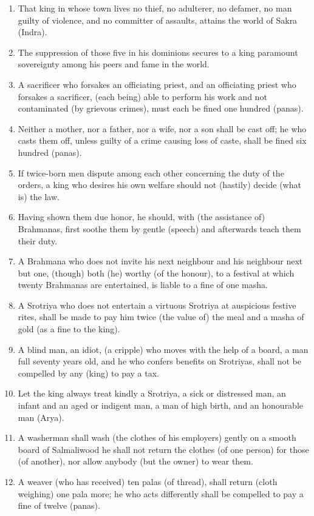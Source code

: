 \begin{enumerate}
\item That king in whose town lives no thief, no adulterer, no defamer, no man guilty of violence, and no committer of assaults, attains the world of Sakra (Indra).
\item The suppression of those five in his dominions secures to a king paramount sovereignty among his peers and fame in the world.
\item A sacrificer who forsakes an officiating priest, and an officiating priest who forsakes a sacrificer, (each being) able to perform his work and not contaminated (by grievous crimes), must each be fined one hundred (panas).
\item Neither a mother, nor a father, nor a wife, nor a son shall be cast off; he who casts them off, unless guilty of a crime causing loss of caste, shall be fined six hundred (panas).
\item If twice-born men dispute among each other concerning the duty of the orders, a king who desires his own welfare should not (hastily) decide (what is) the law.
\item Having shown them due honor, he should, with (the assistance of) Brahmanas, first soothe them by gentle (speech) and afterwards teach them their duty.
\item A Brahmana who does not invite his next neighbour and his neighbour next but one, (though) both (he) worthy (of the honour), to a festival at which twenty Brahmanas are entertained, is liable to a fine of one masha.
\item A Srotriya who does not entertain a virtuous Srotriya at auspicious festive rites, shall be made to pay him twice (the value of) the meal and a masha of gold (as a fine to the king).
\item A blind man, an idiot, (a cripple) who moves with the help of a board, a man full seventy years old, and he who confers benefits on Srotriyas, shall not be compelled by any (king) to pay a tax.
\item Let the king always treat kindly a Srotriya, a sick or distressed man, an infant and an aged or indigent man, a man of high birth, and an honourable man (Arya).
\item A washerman shall wash (the clothes of his employers) gently on a smooth board of Salmaliwood he shall not return the clothes (of one person) for those (of another), nor allow anybody (but the owner) to wear them.
\item A weaver (who has received) ten palas (of thread), shall return (cloth weighing) one pala more; he who acts differently shall be compelled to pay a fine of twelve (panas).

\end{enumerate}

